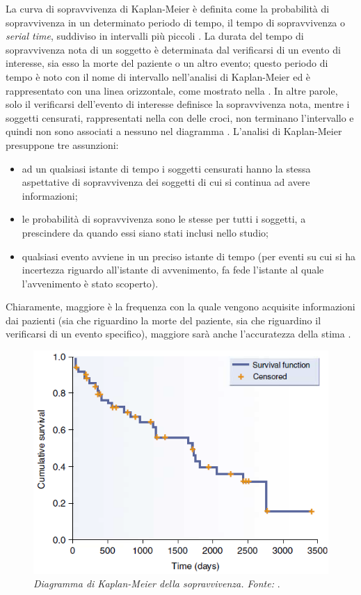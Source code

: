 La curva di sopravvivenza di Kaplan-Meier è definita come la probabilità di sopravvivenza in un determinato periodo di tempo, il tempo di sopravvivenza o \textit{serial time}, suddiviso in intervalli più piccoli \cite{altman, Goel2010}. La durata del tempo di sopravvivenza nota di un soggetto è determinata dal verificarsi di un evento di interesse, sia esso la morte del paziente o un altro evento; questo periodo di tempo è noto con il nome di intervallo nell'analisi di Kaplan-Meier ed è rappresentato con una linea orizzontale, come mostrato nella . In altre parole, solo il verificarsi dell'evento di interesse definisce la sopravvivenza nota, mentre i soggetti censurati, rappresentati nella  con delle croci, non terminano l'intervallo e quindi non sono associati a nessuno  nel diagramma \cite{Rich2010}. L'analisi di Kaplan-Meier presuppone tre assunzioni:
\begin{itemize}[label=$-$]
    \item ad un qualsiasi istante di tempo i soggetti censurati hanno la stessa aspettative di sopravvivenza dei soggetti di cui si continua ad avere informazioni;
    \item le probabilità di sopravvivenza sono le stesse per tutti i soggetti, a prescindere da quando essi siano stati inclusi nello studio;
    \item qualsiasi evento avviene in un preciso istante di tempo (per eventi su cui si ha incertezza riguardo all'istante di avvenimento, fa fede l'istante al quale l'avvenimento è stato scoperto).
\end{itemize}
Chiaramente, maggiore è la frequenza con la quale vengono acquisite informazioni dai pazienti (sia che riguardino la morte del paziente, sia che riguardino il verificarsi di un evento specifico), maggiore sarà anche l'accuratezza della stima \cite{Goel2010}.

\begin{figure}[htpb]
\centering
\includegraphics[scale=0.89]{Immagini/mm_kaplanmeier.png}
\caption{\label{fig:mm_kaplanmeier} \textit{Diagramma di Kaplan-Meier della sopravvivenza. Fonte:} \cite{Jager2008}.}
\end{figure}

